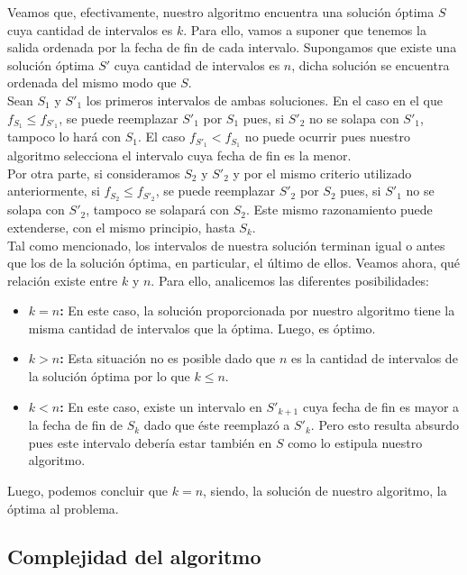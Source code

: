 Veamos que, efectivamente, nuestro algoritmo encuentra una solución óptima $S$ cuya cantidad de intervalos es $k$. Para ello, vamos a suponer que tenemos la salida ordenada por la fecha de fin de cada intervalo. Supongamos que existe una solución óptima $S'$ cuya cantidad de intervalos es $n$, dicha solución se encuentra ordenada del mismo modo que $S$.\\ Sean $S_{1}$ y $S'_{1}$ los primeros intervalos de ambas soluciones. En el caso en el que $f_{S_{1}} \leq f_{S'_{1}}$, se puede reemplazar $S'_{1}$ por $S_{1}$ pues, si $S'_{2}$ no se solapa con $S'_{1}$, tampoco lo hará con $S_{1}$. El caso $f_{S'_{1}} < f_{S_{1}}$ no puede ocurrir pues nuestro algoritmo selecciona el intervalo cuya fecha de fin es la menor.\\
Por otra parte, si consideramos $S_{2}$ y $S'_{2}$ y por el mismo criterio utilizado anteriormente, si $f_{S_{2}} \leq f_{S'_{2}}$, se puede reemplazar $S'_{2}$ por $S_{2}$ pues, si $S'_{1}$ no se solapa con $S'_{2}$, tampoco se solapará con $S_{2}$. Este mismo razonamiento puede extenderse, con el mismo principio, hasta $S_{k}$.\\
Tal como mencionado, los intervalos de nuestra solución terminan igual o antes que los de la solución óptima, en particular, el último de ellos. Veamos ahora, qué relación existe entre $k$ y $n$. Para ello, analicemos las diferentes posibilidades:
\begin{itemize}
\item \textbf{$k = n$:} En este caso, la solución proporcionada por nuestro algoritmo tiene la misma cantidad de intervalos que la óptima. Luego, es óptimo.
\item \textbf{$k > n$:} Esta situación no es posible dado que $n$ es la cantidad de intervalos de la solución óptima por lo que $k \leq n$.
\item \textbf{$k < n$:} En este caso, existe un intervalo en $S'_{k+1}$ cuya fecha de fin es mayor a la fecha de fin de $S_{k}$ dado que éste reemplazó a $S'_{k}$. Pero esto resulta absurdo pues este intervalo debería estar también en $S$ como lo estipula nuestro algoritmo.
\end{itemize}

Luego, podemos concluir que $k = n$, siendo, la solución de nuestro algoritmo, la óptima al problema. 

\subsection{Complejidad del algoritmo}

